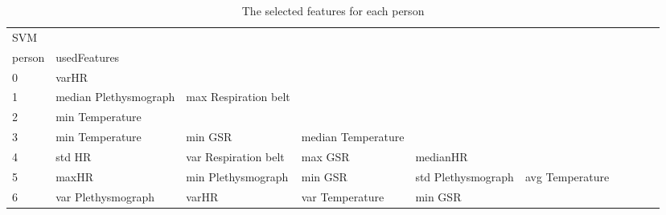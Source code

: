 \begin{landscape}
\begin{table}[]
\centering
\caption{The selected features for each person}
\begin{tabular}{l|llllllll}
SVM      &                         &                       &                         &                         &                         &                       &                      &          &                      &        \\
person   & usedFeatures            &                       &                         &                         &                         &                       &                      &          &                      &        \\
0        & varHR                   &                       &                         &                         &                         &                       &                      &          &                      &        \\
1        & median Plethysmograph   & max Respiration belt  &                         &                         &                         &                       &                      &          &                      &        \\
2        & min Temperature         &                       &                         &                         &                         &                       &                      &          &                      &        \\
3        & min Temperature         & min GSR               & median Temperature      &                         &                         &                       &                      &          &                      &        \\
4        & std HR                  & var Respiration belt  & max GSR                 & medianHR                &                         &                       &                      &          &                      &        \\
5        & maxHR                   & min Plethysmograph    & min GSR                 & std Plethysmograph      & avg Temperature         &                       &                      &          &                      &        \\
6        & var Plethysmograph      & varHR                 & var Temperature         & min GSR                 &                         &                       &                      &          &                      &        \\

\end{tabular}
\end{table}
\end{landscape}
